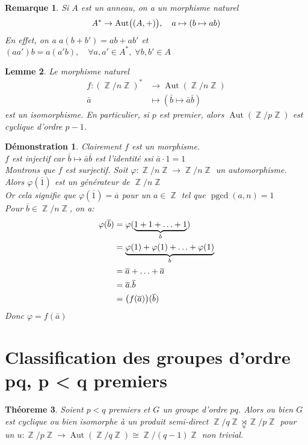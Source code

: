 \documentclass[a4paper, oneside]{report}
\theoremstyle{break}
\newtheorem{thm}{Théoreme}[section] %
\newtheorem{lemme}[thm]{Lemme}
\newtheorem{remarque}[thm]{Remarque}
\newtheorem*{demonstration}{Démonstration}
\DeclareMathOperator{\Z}{\mathbb{Z}}
\DeclarePairedDelimiter\pa{\big(}{\big)}%
\DeclareMathOperator{\pgcd}{pgcd}
\DeclareMathOperator{\Aut}{Aut}
\newcommand{\us}{\underset}
\newcommand{\ol}{\overline}
\newcommand{\ub}{\underbrace}
\begin{document}
\begin{remarque}
Si $A$ est un anneau, on a un morphisme naturel
\[
A^* \rightarrow \Aut\pa{(A, +)}, 	\quad	a \mapsto (b \mapsto ab)
\]
En effet, on a $a(b+b') = ab + ab'$ et $(aa') b = a(a'b),	\quad	\forall a, a' \in A^*, \; \forall b, b' \in A$
\end{remarque}

\begin{lemme}
Le morphisme naturel
\begin{align*}
f: (\Z/n\Z)^* &\rightarrow \Aut(\Z/n\Z)
\\
\bar{a} &\mapsto (\bar{b} \mapsto \bar{a}\bar{b})
\end{align*}
est un isomorphisme. En particulier, si $p$ est premier, alors $\Aut(\Z/p\Z)$ est cyclique d'ordre $p-1$.
\end{lemme}

\begin{demonstration}
Clairement $f$ est un morphisme.\\
$f$ est injectif car $\bar{b} \mapsto \bar{a}\bar{b}$ est l'identité ssi $\bar{a}\cdot 1 = 1$\\
Montrons que $f$ est surjectif. Soit $\varphi : \Z/n\Z \rightarrow \Z/n\Z$ un automorphisme. Alors $\varphi(\ol{1})$ est un générateur de $\Z/n\Z$\\
Or cela signifie que $\varphi(\ol{1}) = \ol{a}$ pour un $a \in \Z$ tel que $\pgcd(a, n) = 1$\\
Pour $\ol{b} \in \Z/n\Z$, on a:
\begin{align*}
\varphi(\ol{b}) &= \varphi(\ub{1 + 1 + \ldots + 1}_{b}) 
\\
&= \ub{\varphi(1) + \varphi(1) + \ldots + \varphi(1)}_{b} 
\\
&= \ol{a} + \ldots + \ol{a} 
\\
&= \ol{a} . \ol{b}
\\
&= \pa{f(\ol{a})}(\ol{b})
\end{align*}
Donc $\varphi = f(\bar{a})$
\end{demonstration}

\section{Classification des groupes d'ordre pq, p < q premiers}

\begin{thm}
Soient $p < q$ premiers et $G$ un groupe d'ordre $pq$. Alors ou bien $G$ est cyclique ou bien isomorphe à un produit semi-direct $\Z/q\Z \us{u}{\rtimes} \Z/p\Z$ pour un $u : \Z/p\Z \rightarrow \Aut(\Z/q\Z)\cong \Z/(q-1)\Z$ non trivial.
\end{thm}
\end{document}
